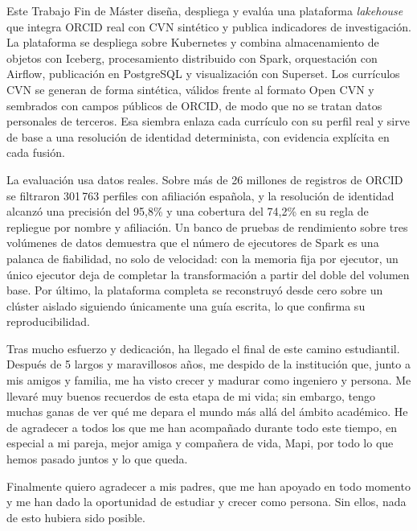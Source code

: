 Este Trabajo Fin de Máster diseña, despliega y evalúa una plataforma
\textit{lakehouse} que integra ORCID real con CVN sintético y publica
indicadores de investigación. La plataforma se despliega sobre Kubernetes y
combina almacenamiento de objetos con Iceberg, procesamiento distribuido con
Spark, orquestación con Airflow, publicación en PostgreSQL y visualización
con Superset. Los currículos CVN se generan de forma sintética, válidos
frente al formato Open CVN y sembrados con campos públicos de ORCID, de modo
que no se tratan datos personales de terceros. Esa siembra enlaza cada
currículo con su perfil real y sirve de base a una resolución de identidad
determinista, con evidencia explícita en cada fusión.

La evaluación usa datos reales. Sobre más de 26 millones de registros de
ORCID se filtraron 301\,763 perfiles con afiliación española, y la
resolución de identidad alcanzó una precisión del 95,8\% y una cobertura del
74,2\% en su regla de repliegue por nombre y afiliación. Un banco de pruebas
de rendimiento sobre tres volúmenes de datos demuestra que el número de
ejecutores de Spark es una palanca de fiabilidad, no solo de velocidad: con
la memoria fija por ejecutor, un único ejecutor deja de completar la
transformación a partir del doble del volumen base. Por último, la
plataforma completa se reconstruyó desde cero sobre un clúster aislado
siguiendo únicamente una guía escrita, lo que confirma su reproducibilidad.

\cleardoublepage
\thispagestyle{plain}
\vspace*{4cm}
\begin{center}
\Large{}
\end{center}
\vskip0.5cm

Tras mucho esfuerzo y dedicación, ha llegado el final de este camino estudiantil.
Después de 5 largos y maravillosos años, me despido de la institución que, junto
a mis amigos y familia, me ha visto crecer y madurar como ingeniero y persona.
Me llevaré muy buenos recuerdos de esta etapa de mi vida; sin embargo, tengo muchas
ganas de ver qué me depara el mundo más allá del ámbito académico. He de agradecer
a todos los que me han acompañado durante todo este tiempo, en especial a mi pareja,
mejor amiga y compañera de vida, Mapi, por todo lo que hemos pasado juntos y lo que queda.

Finalmente quiero agradecer a mis padres, que me han apoyado en todo momento y me han dado la oportunidad de estudiar y crecer como persona. Sin ellos, nada de esto hubiera sido posible.
